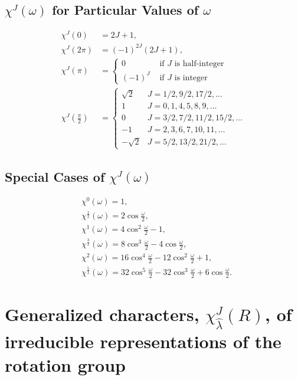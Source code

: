 \subsection{$\chi^{J}(\omega)$ for Particular Values of $\omega$}\label{sec:4.14.10}
\begin{align}
\chi^{J}(0) & =2 J+1 , \label{eq:4:14:63}\\
\chi^{J}(2 \pi) & =(-1)^{2 J}(2 J+1) , \label{eq:4:14:64}\\
\chi^{J}(\pi) & = \begin{cases}0 & \text { if } J \text { is half-integer } \\
(-1)^{J} & \text { if } J \text { is integer }\end{cases}  \label{eq:4:14:65}\\
\chi^{J}\left(\frac{\pi}{2}\right) & = \begin{cases}\sqrt{2} & J=1 / 2,9 / 2,17 / 2, \ldots \\
1 & J=0,1,4,5,8,9, \ldots \\
0 & J=3 / 2,7 / 2,11 / 2,15 / 2, \ldots \\
-1 & J=2,3,6,7,10,11, \ldots \\
-\sqrt{2} & J=5 / 2,13 / 2,21 / 2, \ldots\end{cases} \label{eq:4:14:66}
\end{align}
\subsection{Special Cases of $\chi^{J}(\omega)$}\label{sec:4.14.11}
\begin{align}
& \chi^{0}(\omega)=1 , \label{eq:4:14:67}\\
& \chi^{\frac{1}{2}}(\omega)=2 \cos \frac{\omega}{2},  \label{eq:4:14:68}\\
& \chi^{1}(\omega)=4 \cos ^{2} \frac{\omega}{2}-1 , \label{eq:4:14:69}\\
& \chi^{\frac{3}{2}}(\omega)=8 \cos ^{3} \frac{\omega}{2}-4 \cos \frac{\omega}{2}  ,\label{eq:4:14:70}\\
& \chi^{2}(\omega)=16 \cos ^{4} \frac{\omega}{2}-12 \cos ^{2} \frac{\omega}{2}+1  ,\label{eq:4:14:71}\\
& \chi^{\frac{5}{2}}(\omega)=32 \cos ^{5} \frac{\omega}{2}-32 \cos ^{3} \frac{\omega}{2}+6 \cos \frac{\omega}{2} .\label{eq:4:14:72}
\end{align}
\section{Generalized characters, $\chi_{\hat{\lambda}}^{J}(R)$, of irreducible representations of the rotation group}\label{sec:4.15}
